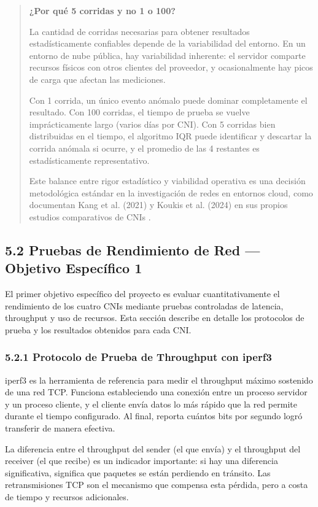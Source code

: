 \documentclass[journal]{IEEEtran}
\begin{document}
\begin{quote}
\textbf{¿Por qué 5 corridas y no 1 o 100?}

La cantidad de corridas necesarias para obtener resultados estadísticamente confiables depende de la variabilidad del entorno. En un entorno de nube pública, hay variabilidad inherente: el servidor comparte recursos físicos con otros clientes del proveedor, y ocasionalmente hay picos de carga que afectan las mediciones.

Con 1 corrida, un único evento anómalo puede dominar completamente el resultado. Con 100 corridas, el tiempo de prueba se vuelve imprácticamente largo (varios días por CNI). Con 5 corridas bien distribuidas en el tiempo, el algoritmo IQR puede identificar y descartar la corrida anómala si ocurre, y el promedio de las 4 restantes es estadísticamente representativo.

Este balance entre rigor estadístico y viabilidad operativa es una decisión metodológica estándar en la investigación de redes en entornos cloud, como documentan Kang et al. (2021) y Koukis et al. (2024) en sus propios estudios comparativos de CNIs \cite{ref7,ref8}.
\end{quote}

\subsection{5.2 Pruebas de Rendimiento de Red --- Objetivo Específico 1}

El primer objetivo específico del proyecto es evaluar cuantitativamente el rendimiento de los cuatro CNIs mediante pruebas controladas de latencia, throughput y uso de recursos. Esta sección describe en detalle los protocolos de prueba y los resultados obtenidos para cada CNI.

\subsubsection{5.2.1 Protocolo de Prueba de Throughput con iperf3}

iperf3 es la herramienta de referencia para medir el throughput máximo sostenido de una red TCP. Funciona estableciendo una conexión entre un proceso servidor y un proceso cliente, y el cliente envía datos lo más rápido que la red permite durante el tiempo configurado. Al final, reporta cuántos bits por segundo logró transferir de manera efectiva.

La diferencia entre el throughput del sender (el que envía) y el throughput del receiver (el que recibe) es un indicador importante: si hay una diferencia significativa, significa que paquetes se están perdiendo en tránsito. Las retransmisiones TCP son el mecanismo que compensa esta pérdida, pero a costa de tiempo y recursos adicionales.
\end{document}
